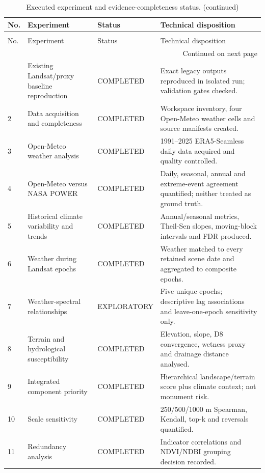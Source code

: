 \begingroup
\scriptsize
\setlength{\tabcolsep}{3pt}
\begin{longtable}{p{}p{}p{}p{}}
\caption{Executed experiment and evidence-completeness status.}\label{tab:experiment-status}\\
\toprule
No. & Experiment & Status & Technical disposition \\
\midrule
\endfirsthead
\caption[]{Executed experiment and evidence-completeness status. (continued)}\\
\toprule
No. & Experiment & Status & Technical disposition \\
\midrule
\endhead
\midrule
\multicolumn{4}{r}{Continued on next page}\\
\endfoot
\bottomrule
\endlastfoot
1 & Existing Landsat/proxy baseline reproduction & COMPLETED & Exact legacy outputs reproduced in isolated run; validation gates checked. \\
2 & Data acquisition and completeness & COMPLETED & Workspace inventory, four Open-Meteo weather cells and source manifests created. \\
3 & Open-Meteo weather analysis & COMPLETED & 1991--2025 ERA5-Seamless daily data acquired and quality controlled. \\
4 & Open-Meteo versus NASA POWER & COMPLETED & Daily, seasonal, annual and extreme-event agreement quantified; neither treated as ground truth. \\
5 & Historical climate variability and trends & COMPLETED & Annual/seasonal metrics, Theil-Sen slopes, moving-block intervals and FDR produced. \\
6 & Weather during Landsat epochs & COMPLETED & Weather matched to every retained scene date and aggregated to composite epochs. \\
7 & Weather-spectral relationships & EXPLORATORY & Five unique epochs; descriptive lag associations and leave-one-epoch sensitivity only. \\
8 & Terrain and hydrological susceptibility & COMPLETED & Elevation, slope, D8 convergence, wetness proxy and drainage distance analysed. \\
9 & Integrated component priority & COMPLETED & Hierarchical landscape/terrain score plus climate context; not monument risk. \\
10 & Scale sensitivity & COMPLETED & 250/500/1000 m Spearman, Kendall, top-k and reversals quantified. \\
11 & Redundancy analysis & COMPLETED & Indicator correlations and NDVI/NDBI grouping decision recorded. \\

\end{longtable}
